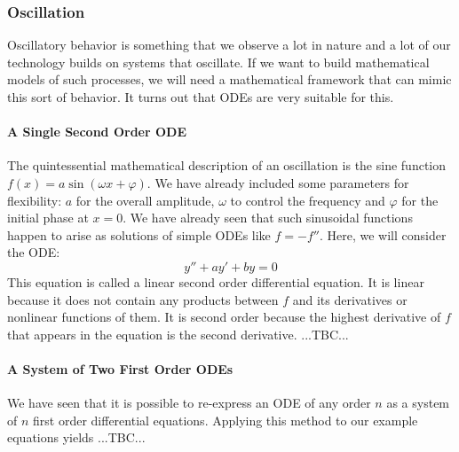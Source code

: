 \subsubsection{Oscillation}
Oscillatory behavior is something that we observe a lot in nature and a lot of our technology builds on systems that oscillate. If we want to build mathematical models of such processes, we will need a mathematical framework that can mimic this sort of behavior. It turns out that ODEs are very suitable for this.

\paragraph{A Single Second Order ODE}
The quintessential mathematical description of an oscillation is the sine function $f(x) = a \sin(\omega x + \varphi)$. We have already included some parameters for flexibility: $a$ for the overall amplitude, $\omega$ to control the frequency and $\varphi$ for the initial phase at $x=0$. We have already seen that such sinusoidal functions happen to arise as solutions of simple ODEs like $f = -f''$. Here, we will consider the ODE:
\begin{equation}
 y'' + a y' + b y = 0
\end{equation}
This equation is called a linear second order differential equation. It is linear because it does not contain any products between $f$ and its derivatives or nonlinear functions of them. It is second order because the highest derivative of $f$ that appears in the equation is the second derivative. ...TBC...






\paragraph{A System of Two First Order ODEs}
We have seen that it is possible to re-express an ODE of any order $n$ as a system of $n$ first order differential equations. Applying this method to our example equations yields ...TBC...


